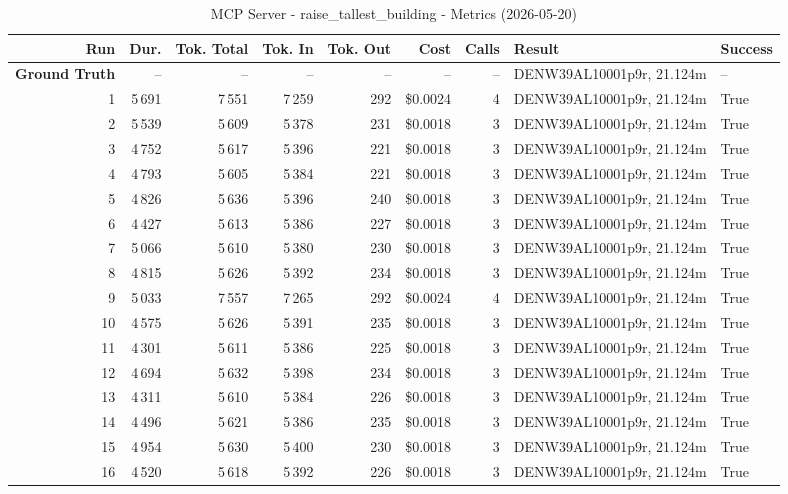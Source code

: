 \documentclass[a4paper,11pt]{article}
\begin{document}
\begin{table}[ht]
\centering
\scriptsize
\caption{MCP Server - raise\_tallest\_building - Metrics (2026-05-20)}
\label{tab:mcp\_raise\_tallest\_building\_metrics\_2026-05-20}
\begin{tabular}{r r r r r r r p{3cm} l}
\hline
Run & Dur. & Tok. Total & Tok. In & Tok. Out & Cost & Calls & Result & Success \\
\hline
\textbf{Ground Truth} & -- & -- & -- & -- & -- & -- & DENW39AL10001p9r, 21.124m & -- \\
\hline
1 & 5\,691 & 7\,551 & 7\,259 & 292 & \$0.0024 & 4 & DENW39AL10001p9r, 21.124m & True \\
2 & 5\,539 & 5\,609 & 5\,378 & 231 & \$0.0018 & 3 & DENW39AL10001p9r, 21.124m & True \\
3 & 4\,752 & 5\,617 & 5\,396 & 221 & \$0.0018 & 3 & DENW39AL10001p9r, 21.124m & True \\
4 & 4\,793 & 5\,605 & 5\,384 & 221 & \$0.0018 & 3 & DENW39AL10001p9r, 21.124m & True \\
5 & 4\,826 & 5\,636 & 5\,396 & 240 & \$0.0018 & 3 & DENW39AL10001p9r, 21.124m & True \\
6 & 4\,427 & 5\,613 & 5\,386 & 227 & \$0.0018 & 3 & DENW39AL10001p9r, 21.124m & True \\
7 & 5\,066 & 5\,610 & 5\,380 & 230 & \$0.0018 & 3 & DENW39AL10001p9r, 21.124m & True \\
8 & 4\,815 & 5\,626 & 5\,392 & 234 & \$0.0018 & 3 & DENW39AL10001p9r, 21.124m & True \\
9 & 5\,033 & 7\,557 & 7\,265 & 292 & \$0.0024 & 4 & DENW39AL10001p9r, 21.124m & True \\
10 & 4\,575 & 5\,626 & 5\,391 & 235 & \$0.0018 & 3 & DENW39AL10001p9r, 21.124m & True \\
11 & 4\,301 & 5\,611 & 5\,386 & 225 & \$0.0018 & 3 & DENW39AL10001p9r, 21.124m & True \\
12 & 4\,694 & 5\,632 & 5\,398 & 234 & \$0.0018 & 3 & DENW39AL10001p9r, 21.124m & True \\
13 & 4\,311 & 5\,610 & 5\,384 & 226 & \$0.0018 & 3 & DENW39AL10001p9r, 21.124m & True \\
14 & 4\,496 & 5\,621 & 5\,386 & 235 & \$0.0018 & 3 & DENW39AL10001p9r, 21.124m & True \\
15 & 4\,954 & 5\,630 & 5\,400 & 230 & \$0.0018 & 3 & DENW39AL10001p9r, 21.124m & True \\
16 & 4\,520 & 5\,618 & 5\,392 & 226 & \$0.0018 & 3 & DENW39AL10001p9r, 21.124m & True \\

\end{tabular}
\end{table}
\end{document}
